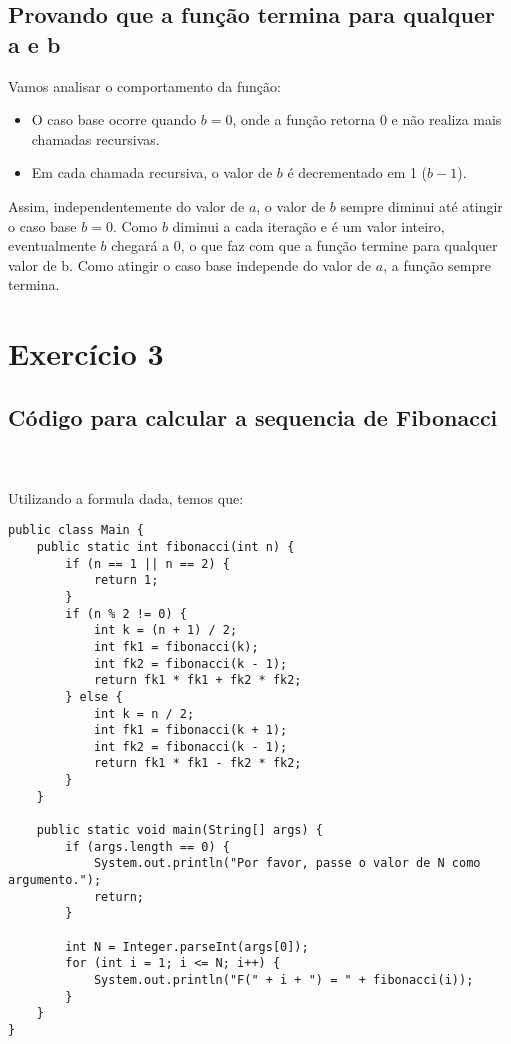 \documentclass[11pt,reqno,a4paper]{amsart}
\begin{document}
\subsection{Provando que a função termina para qualquer a e b}

Vamos analisar o comportamento da função:
\begin{itemize}
    \item O caso base ocorre quando \( b = 0 \), onde a função retorna 0 e não realiza mais chamadas recursivas.
    \item Em cada chamada recursiva, o valor de \( b \) é decrementado em 1 (\( b - 1 \)).
\end{itemize}
Assim, independentemente do valor de \( a \), o valor de \( b \) sempre diminui até atingir o caso base \( b = 0 \). Como \( b \) diminui a cada iteração e é um valor inteiro, eventualmente \( b \) chegará a 0, o que faz com que a função termine para qualquer valor de b. Como atingir o caso base independe do valor de $a$, a função sempre termina.\
\newpage
\section{Exercício 3}
\subsection{Código para calcular a sequencia de Fibonacci}
\
\\
\\
Utilizando a formula dada, temos que:
\\
\begin{verbatim}
public class Main {
    public static int fibonacci(int n) {
        if (n == 1 || n == 2) {
            return 1;
        }
        if (n % 2 != 0) {
            int k = (n + 1) / 2;
            int fk1 = fibonacci(k);
            int fk2 = fibonacci(k - 1);
            return fk1 * fk1 + fk2 * fk2;
        } else {
            int k = n / 2;
            int fk1 = fibonacci(k + 1);
            int fk2 = fibonacci(k - 1);
            return fk1 * fk1 - fk2 * fk2;
        }
    }

    public static void main(String[] args) {
        if (args.length == 0) {
            System.out.println("Por favor, passe o valor de N como argumento.");
            return;
        }

        int N = Integer.parseInt(args[0]);
        for (int i = 1; i <= N; i++) {
            System.out.println("F(" + i + ") = " + fibonacci(i));
        }
    }
}
\end{verbatim}
\end{document}
